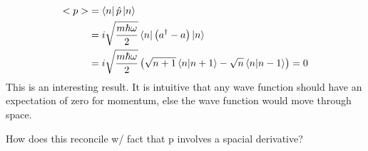 \documentclass[10pt]{article} %
\begin{document}
\begin{align*}
  <p> &= \bra{n}\hat{p}\ket{n}\\
  &= i\sqrt{\frac{m\hbar\omega}{2}}\bra{n}\left(a^\dagger-a\right)\ket{n}\\
  &= i\sqrt{\frac{m\hbar\omega}{2}}
  \left(\sqrt{n+1}\bra{n}\ket{n+1} - \sqrt{n}\bra{n}\ket{n-1}\right) = 0\\
\end{align*}
This is an interesting result. It is intuitive that any wave function should have an expectation of
zero for momentum, else the wave function would move through space.

How does this reconcile w/ fact that p involves a spacial derivative?
\end{document}
